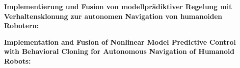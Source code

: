 \thispagestyle{empty}
\begin{center}
  \begin{minipage}[c][0.48\textheight][b]{0.9\textwidth}
    \small
    \textbf{
      Implementierung und Fusion von modellprädiktiver Regelung mit Verhaltensklonung zur autonomen Navigation von humanoiden Robotern:
    }\par
    \vspace{\baselineskip}
    
  \end{minipage}\par
  \vfill
  \begin{minipage}[c][0.48\textheight][b]{0.9\textwidth}
    \small
    \textbf{
      Implementation and Fusion of Nonlinear Model Predictive Control with Behavioral Cloning for Autonomous Navigation of Humanoid Robots:
    }\par
    \vspace{\baselineskip}
    
  \end{minipage}
\end{center}
